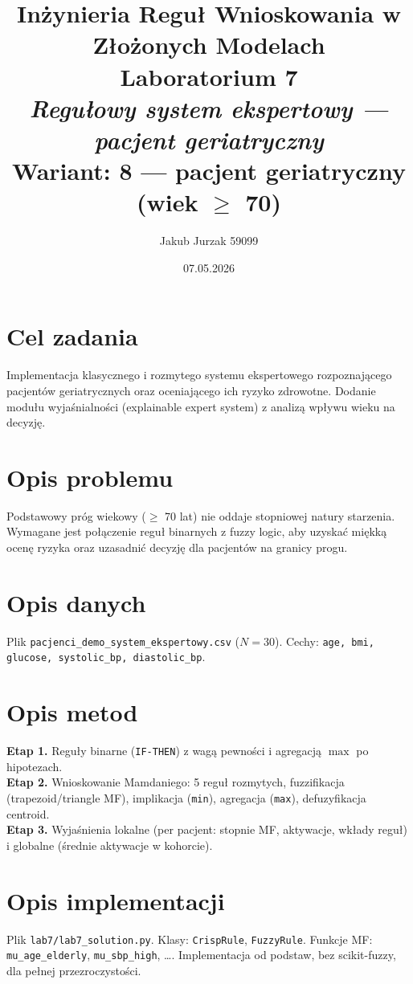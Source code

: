 \documentclass[12pt,a4paper]{article}
\title{
  \vspace{2cm}
  \LARGE\textbf{Inżynieria Reguł Wnioskowania w Złożonych Modelach}\\[0.6cm]
  \Large Laboratorium 7\\[0.4cm]
  \large \textit{Regułowy system ekspertowy --- pacjent geriatryczny}\\[0.3cm]
  \normalsize Wariant: \textbf{8 — pacjent geriatryczny (wiek $\ge$ 70)}
}
\author{Jakub Jurzak 59099}
\date{07.05.2026}
\begin{document}
\maketitle
\thispagestyle{empty}
\newpage

\tableofcontents
\newpage

\section{Cel zadania}
Implementacja klasycznego i rozmytego systemu ekspertowego rozpoznającego pacjentów geriatrycznych oraz oceniającego ich ryzyko zdrowotne. Dodanie modułu wyjaśnialności (explainable expert system) z analizą wpływu wieku na decyzję.

\section{Opis problemu}
Podstawowy próg wiekowy ($\ge$ 70 lat) nie oddaje stopniowej natury starzenia. Wymagane jest połączenie reguł binarnych z fuzzy logic, aby uzyskać miękką ocenę ryzyka oraz uzasadnić decyzję dla pacjentów na granicy progu.

\section{Opis danych}
Plik \texttt{pacjenci\_demo\_system\_ekspertowy.csv} ($N=30$). Cechy: \texttt{age, bmi, glucose, systolic\_bp, diastolic\_bp}.

\section{Opis metod}
\textbf{Etap 1.} Reguły binarne (\texttt{IF-THEN}) z wagą pewności i agregacją $\max$ po hipotezach.\\\textbf{Etap 2.} Wnioskowanie Mamdaniego: 5 reguł rozmytych, fuzzifikacja (trapezoid/triangle MF), implikacja (\texttt{min}), agregacja (\texttt{max}), defuzyfikacja centroid.\\\textbf{Etap 3.} Wyjaśnienia lokalne (per pacjent: stopnie MF, aktywacje, wkłady reguł) i globalne (średnie aktywacje w kohorcie).

\section{Opis implementacji}
Plik \texttt{lab7/lab7\_solution.py}. Klasy: \texttt{CrispRule}, \texttt{FuzzyRule}. Funkcje MF: \texttt{mu\_age\_elderly}, \texttt{mu\_sbp\_high}, \dots. Implementacja od podstaw, bez scikit-fuzzy, dla pełnej przezroczystości.
\end{document}
